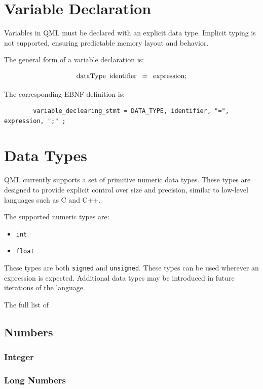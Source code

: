 \documentclass[12pt]{report}
\begin{document}
	\section{Variable Declaration}
	
	Variables in QML must be declared with an explicit data type. Implicit typing is not supported, ensuring predictable memory layout and behavior.
	
	The general form of a variable declaration is:
	
	\[
		\text{dataType} \hspace{0.5em} \text{identifier} \hspace{0.5em} = \hspace{0.5em} \text{expression} ;
	\]
	
	The corresponding EBNF definition is:
	
	\begin{verbatim}
		variable_declearing_stmt = DATA_TYPE, identifier, "=", expression, ";" ;
	\end{verbatim}
	
	\section{Data Types}
	\label{sec:datatype}
	
	QML currently supports a set of primitive numeric data types. These types are designed to provide explicit control over size and precision, similar to low-level languages such as C and C++.
	
	The supported numeric types are:
	
	\begin{itemize}
		\item \texttt{int}
		\item \texttt{float}
	\end{itemize}
	
	These types are both \texttt{signed} and \texttt{unsigned}. These types can be used wherever an expression is expected. Additional data types may be introduced in future iterations of the language.
	
	The full list of 
	
	\subsection{Numbers}
	\subsubsection{Integer}
	\subsubsection{Long Numbers}
\end{document}
